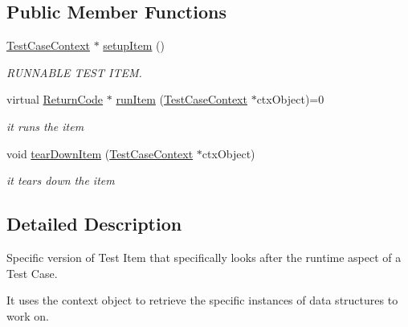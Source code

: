\subsection*{Public Member Functions}
\begin{DoxyCompactItemize}
\item 
\hyperlink{classit_1_1testbench_1_1data_1_1TestCaseContext}{Test\-Case\-Context} $\ast$ \hyperlink{classit_1_1testbench_1_1data_1_1RunnableTestItem_a780eaaa89930607c6fa068b48d31666f}{setup\-Item} ()
\begin{DoxyCompactList}\small\item\em R\-U\-N\-N\-A\-B\-L\-E T\-E\-S\-T I\-T\-E\-M. \end{DoxyCompactList}\item 
virtual \hyperlink{structit_1_1testbench_1_1data_1_1ReturnCode}{Return\-Code} $\ast$ \hyperlink{classit_1_1testbench_1_1data_1_1RunnableTestItem_a3a7860cb8e6bea90c6bff5e2794cd7ec}{run\-Item} (\hyperlink{classit_1_1testbench_1_1data_1_1TestCaseContext}{Test\-Case\-Context} $\ast$ctx\-Object)=0
\begin{DoxyCompactList}\small\item\em it runs the item \end{DoxyCompactList}\item 
void \hyperlink{classit_1_1testbench_1_1data_1_1RunnableTestItem_aaec2facacf37322a53119ea32c3ce75a}{tear\-Down\-Item} (\hyperlink{classit_1_1testbench_1_1data_1_1TestCaseContext}{Test\-Case\-Context} $\ast$ctx\-Object)
\begin{DoxyCompactList}\small\item\em it tears down the item \end{DoxyCompactList}\end{DoxyCompactItemize}


\subsection{Detailed Description}
Specific version of Test Item that specifically looks after the runtime aspect of a Test Case.

It uses the context object to retrieve the specific instances of data structures to work on. 

